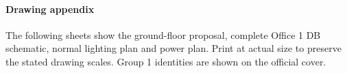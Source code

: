 \documentclass[11pt]{article}
\begin{document}
\paragraph*{Drawing appendix}
The following sheets show the ground-floor proposal, complete Office 1 DB schematic, normal lighting plan and power plan. Print at actual size to preserve the stated drawing scales. Group 1 identities are shown on the official cover.
\clearpage\ClearShipoutPictureBG




\end{document}
